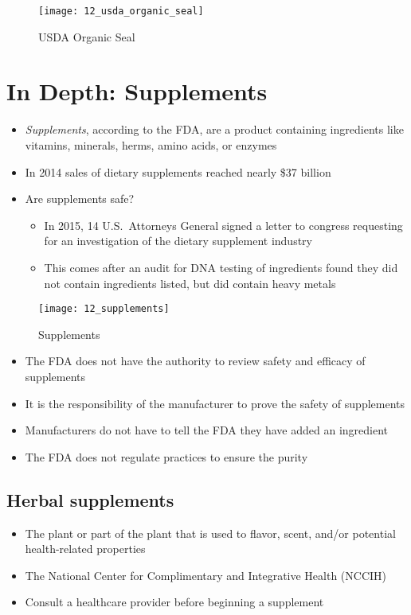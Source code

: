 \documentclass[title={Chapter 12}]{fdsn201notes}
\begin{document}
\begin{figure}[H]
	\centering
	\texttt{[image: 12\_usda\_organic\_seal]}
	\caption{USDA Organic Seal}
	\label{fig:usda-organic-seal}
\end{figure}

\section{In Depth: Supplements}\label{sec:in-depth:-supplements}
\begin{itemize}
	\item \emph{Supplements}, according to the FDA, are a product containing ingredients like vitamins, minerals, herms, amino acids, or enzymes
	\item In 2014 sales of dietary supplements reached nearly \$37 billion
	\item Are supplements safe?
	\begin{itemize}
		\item In 2015, 14 U.S.\ Attorneys General signed a letter to congress requesting for an investigation of the dietary supplement industry
		\item This comes after an audit for DNA testing of ingredients found they did not contain ingredients listed, but did contain heavy metals
	\end{itemize}
\end{itemize}

\begin{figure}[H]
	\centering
	\texttt{[image: 12\_supplements]}
	\caption{Supplements}
	\label{fig:supplements}
\end{figure}

\begin{itemize}
	\item The FDA does not have the authority to review safety and efficacy of supplements
	\item It is the responsibility of the manufacturer to prove the safety of supplements
	\item Manufacturers do not have to tell the FDA they have added an ingredient
	\item The FDA does not regulate practices to ensure the purity
\end{itemize}

\subsection{Herbal supplements}\label{subsec:herbal-supplements}
\begin{itemize}
	\item The plant or part of the plant that is used to flavor, scent, and/or potential health-related properties
	\item The National Center for Complimentary and Integrative Health (NCCIH)
	\item Consult a healthcare provider before beginning a supplement
\end{itemize}
\end{document}
